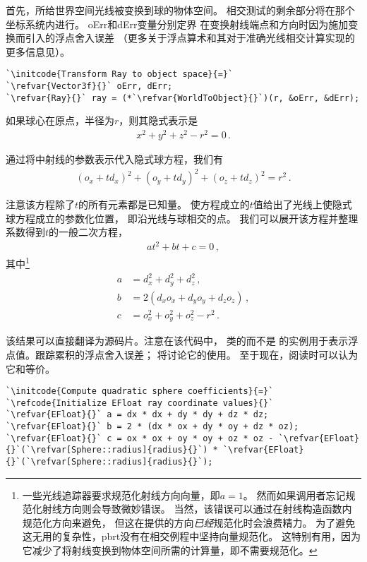 首先，所给世界空间光线被变换到球的物体空间。
相交测试的剩余部分将在那个坐标系统内进行。
{\ttfamily oErr}和{\ttfamily dErr}变量分别定界
在变换射线端点和方向时因为施加变换而引入的浮点舍入误差
（更多关于浮点算术和其对于准确光线相交计算实现的更多信息见）。
\begin{lstlisting}
`\initcode{Transform Ray to object space}{=}`
`\refvar{Vector3f}{}` oErr, dErr;
`\refvar{Ray}{}` ray = (*`\refvar{WorldToObject}{}`)(r, &oErr, &dErr);
\end{lstlisting}

如果球心在原点，半径为$r$，则其隐式表示是
\begin{align*}
    x^2+y^2+z^2-r^2=0\, .
\end{align*}

通过将中射线的参数表示代入隐式球方程，我们有
\begin{align*}
    (o_x+td_x)^2+(o_y+td_y)^2+(o_z+td_z)^2=r^2\, .
\end{align*}

注意该方程除了$t$的所有元素都是已知量。
使方程成立的$t$值给出了光线上使隐式球方程成立的参数化位置，
即沿光线与球相交的点。
我们可以展开该方程并整理系数得到$t$的一般二次方程，
\begin{align*}
    at^2+bt+c=0\, ,
\end{align*}
其中\footnote{一些光线追踪器要求规范化射线方向向量，即$a=1$。
    然而如果调用者忘记规范化射线方向则会导致微妙错误。
    当然，该错误可以通过在射线构造函数内规范化方向来避免，
    但这在提供的方向\emph{已经}规范化时会浪费精力。
    为了避免这无用的复杂性，pbrt没有在相交例程中坚持向量规范化。
    这特别有用，因为它减少了将射线变换到物体空间所需的计算量，即不需要规范化。}
\begin{align*}
    a & =d_x^2+d_y^2+d_z^2\, ,       \\
    b & =2(d_xo_x+d_yo_y+d_zo_z)\, , \\
    c & =o_x^2+o_y^2+o_z^2-r^2\, .
\end{align*}

该结果可以直接翻译为源码片。注意在该代码中，
类的而不是
的实例用于表示浮点值。跟踪累积的浮点舍入误差；
将讨论它的使用。
至于现在，阅读时可以认为它和等价。
\begin{lstlisting}
`\initcode{Compute quadratic sphere coefficients}{=}`
`\refcode{Initialize EFloat ray coordinate values}{}`
`\refvar{EFloat}{}` a = dx * dx + dy * dy + dz * dz;
`\refvar{EFloat}{}` b = 2 * (dx * ox + dy * oy + dz * oz);
`\refvar{EFloat}{}` c = ox * ox + oy * oy + oz * oz - `\refvar{EFloat}{}`(`\refvar[Sphere::radius]{radius}{}`) * `\refvar{EFloat}{}`(`\refvar[Sphere::radius]{radius}{}`);
\end{lstlisting}

